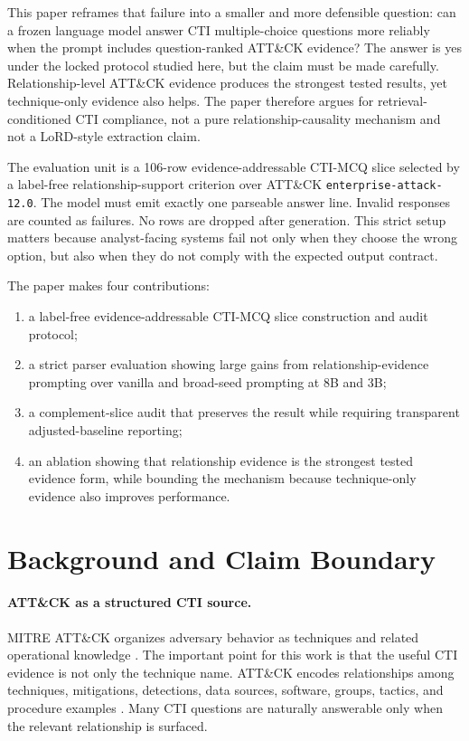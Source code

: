 \documentclass[10pt]{article}
\begin{document}
This paper reframes that failure into a smaller and more defensible question:
can a frozen language model answer CTI multiple-choice questions more reliably when the prompt includes question-ranked ATT\&CK evidence?
The answer is yes under the locked protocol studied here, but the claim must be made carefully.
Relationship-level ATT\&CK evidence produces the strongest tested results, yet technique-only evidence also helps.
The paper therefore argues for retrieval-conditioned CTI compliance, not a pure relationship-causality mechanism and not a LoRD-style extraction claim.

The evaluation unit is a 106-row evidence-addressable CTI-MCQ slice selected by a label-free relationship-support criterion over ATT\&CK \texttt{enterprise-attack-12.0}.
The model must emit exactly one parseable answer line.
Invalid responses are counted as failures.
No rows are dropped after generation.
This strict setup matters because analyst-facing systems fail not only when they choose the wrong option, but also when they do not comply with the expected output contract.

The paper makes four contributions:
\begin{enumerate}[leftmargin=*]
  \item a label-free evidence-addressable CTI-MCQ slice construction and audit protocol;
  \item a strict parser evaluation showing large gains from relationship-evidence prompting over vanilla and broad-seed prompting at 8B and 3B;
  \item a complement-slice audit that preserves the result while requiring transparent adjusted-baseline reporting;
  \item an ablation showing that relationship evidence is the strongest tested evidence form, while bounding the mechanism because technique-only evidence also improves performance.
\end{enumerate}

\section{Background and Claim Boundary}

\paragraph{ATT\&CK as a structured CTI source.}
MITRE ATT\&CK organizes adversary behavior as techniques and related operational knowledge \cite{strom2020attack}.
The important point for this work is that the useful CTI evidence is not only the technique name.
ATT\&CK encodes relationships among techniques, mitigations, detections, data sources, software, groups, tactics, and procedure examples \cite{mitreAttackRelationships}.
Many CTI questions are naturally answerable only when the relevant relationship is surfaced.
\end{document}

